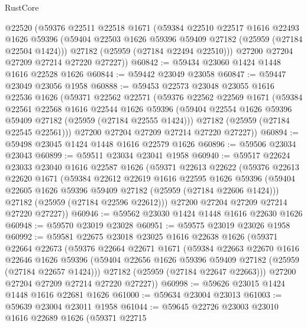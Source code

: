 \begin{lexlean}{RustCore}
\begin{coremodule}
      @22520
      (@59376
        @22511
        @22518
        @1671
        (@59384
          @22510
          @22517
          @1616
          @22493
          @1626
          @59396
          (@59404 @22503 @1626 @59396 @59409 @27182 (@25959 (@27184 @22504 @1424)))
          @27182
          (@25959 (@27184 @22494 @22510)))
        @27200
        @27204
        @27209
        @27214
        @27220
        @27227))
@60842 := @59434 @23060 @1424 @1448 @1616 @22528 @1626
@60844 := @59442 @23049 @23058
@60847 := @59447 @23049 @23056 @1958
@60888 := @59453
    @22573
    @23048
    @23055
    @1616
    @22536
    @1626
    (@59371
      @22562
      @22571
      (@59376
        @22562
        @22569
        @1671
        (@59384
          @22561
          @22568
          @1616
          @22544
          @1626
          @59396
          (@59404 @22554 @1626 @59396 @59409 @27182 (@25959 (@27184 @22555 @1424)))
          @27182
          (@25959 (@27184 @22545 @22561)))
        @27200
        @27204
        @27209
        @27214
        @27220
        @27227))
@60894 := @59498 @23045 @1424 @1448 @1616 @22579 @1626
@60896 := @59506 @23034 @23043
@60899 := @59511 @23034 @23041 @1958
@60940 := @59517
    @22624
    @23033
    @23040
    @1616
    @22587
    @1626
    (@59371
      @22613
      @22622
      (@59376
        @22613
        @22620
        @1671
        (@59384
          @22612
          @22619
          @1616
          @22595
          @1626
          @59396
          (@59404 @22605 @1626 @59396 @59409 @27182 (@25959 (@27184 @22606 @1424)))
          @27182
          (@25959 (@27184 @22596 @22612)))
        @27200
        @27204
        @27209
        @27214
        @27220
        @27227))
@60946 := @59562 @23030 @1424 @1448 @1616 @22630 @1626
@60948 := @59570 @23019 @23028
@60951 := @59575 @23019 @23026 @1958
@60992 := @59581
    @22675
    @23018
    @23025
    @1616
    @22638
    @1626
    (@59371
      @22664
      @22673
      (@59376
        @22664
        @22671
        @1671
        (@59384
          @22663
          @22670
          @1616
          @22646
          @1626
          @59396
          (@59404 @22656 @1626 @59396 @59409 @27182 (@25959 (@27184 @22657 @1424)))
          @27182
          (@25959 (@27184 @22647 @22663)))
        @27200
        @27204
        @27209
        @27214
        @27220
        @27227))
@60998 := @59626 @23015 @1424 @1448 @1616 @22681 @1626
@61000 := @59634 @23004 @23013
@61003 := @59639 @23004 @23011 @1958
@61044 := @59645
    @22726
    @23003
    @23010
    @1616
    @22689
    @1626
    (@59371
      @22715

\end{coremodule}
\end{lexlean}
